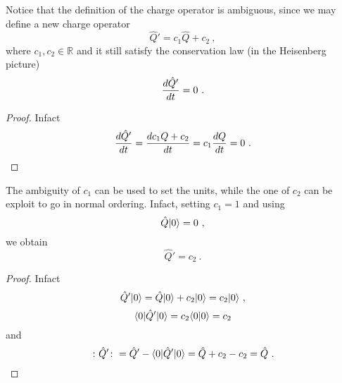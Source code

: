     Notice that the definition of the charge operator is ambiguous, since we may define a new charge operator 
    \begin{equation*}
        \hat Q' = c_1 \hat Q + c_2 ~,
    \end{equation*}
    where $c_1, c_2 \in \mathbb R$ and it still satisfy the conservation law (in the Heisenberg picture)
    \begin{equation*}
        \frac{d\hat Q'}{dt} = 0 ~.
    \end{equation*}
    \begin{proof}
        Infact 
        \begin{equation*}
            \frac{d\hat Q'}{dt} = \frac{dc_1 Q + c_2}{dt} = c_1 \frac{dQ}{dt} = 0 ~.
        \end{equation*}
    \end{proof}
    The ambiguity of $c_1$ can be used to set the units, while the one of $c_2$ can be exploit to go in normal ordering. Infact, setting $c_1 = 1$ and using
    \begin{equation*}
        \hat Q \vert0\rangle = 0 ~,
    \end{equation*}
    we obtain 
    \begin{equation*}
        \hat Q' = c_2 ~.
    \end{equation*}
    \begin{proof}
        Infact 
        \begin{equation}
            \hat Q' \vert0\rangle = \hat Q \vert0\rangle + c_2 \vert0\rangle = c_2 \vert0\rangle ~,
        \end{equation}
        \begin{equation*}
            \langle0\vert \hat Q' \vert0\rangle = c_2 \langle0\vert0\rangle = c_2
        \end{equation*}
        and 
        \begin{equation*}
            \colon \hat Q' \colon = \hat Q' - \langle0\vert \hat Q' \vert0\rangle = \hat Q + c_2 - c_2 = \hat Q ~.
        \end{equation*}
    \end{proof}

